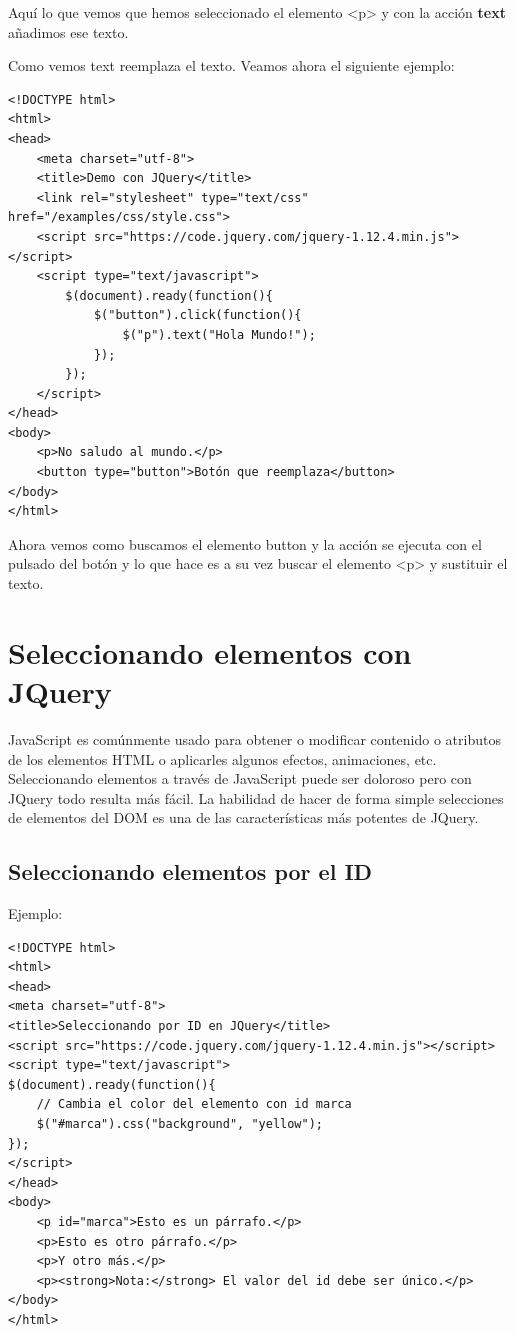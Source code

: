 \documentclass[11pt]{article}
\begin{document}
Aquí lo que vemos que hemos seleccionado el elemento <p> y con la acción \textbf{text} añadimos ese texto. 

Como vemos text reemplaza el texto. Veamos ahora el siguiente ejemplo:

\begin{verbatim}
<!DOCTYPE html>
<html>
<head>
    <meta charset="utf-8">
    <title>Demo con JQuery</title>
    <link rel="stylesheet" type="text/css" href="/examples/css/style.css">
    <script src="https://code.jquery.com/jquery-1.12.4.min.js"></script>
    <script type="text/javascript">
        $(document).ready(function(){
            $("button").click(function(){
                $("p").text("Hola Mundo!");
            });            
        });
    </script>
</head>
<body>
    <p>No saludo al mundo.</p>
    <button type="button">Botón que reemplaza</button>
</body>
</html>  
\end{verbatim}

Ahora vemos como buscamos el elemento button y la acción se ejecuta con el pulsado del botón y lo que hace es a su vez buscar el elemento <p> y sustituir el texto. 


\section*{Seleccionando elementos con JQuery}
\label{sec:org1c68db2}

JavaScript es comúnmente usado para obtener o modificar contenido o atributos de los elementos HTML o aplicarles algunos efectos, animaciones, etc. 
Seleccionando elementos a través de JavaScript puede ser doloroso pero con JQuery todo resulta más fácil. La habilidad de hacer de forma simple selecciones de elementos del DOM es una de las características más potentes de JQuery. 

\subsection*{Seleccionando elementos por el ID}
\label{sec:org649c28c}

Ejemplo:

\begin{verbatim}
<!DOCTYPE html>
<html>
<head>
<meta charset="utf-8">
<title>Seleccionando por ID en JQuery</title>
<script src="https://code.jquery.com/jquery-1.12.4.min.js"></script>
<script type="text/javascript">
$(document).ready(function(){
    // Cambia el color del elemento con id marca
    $("#marca").css("background", "yellow");
});
</script> 
</head>
<body>
    <p id="marca">Esto es un párrafo.</p>
    <p>Esto es otro párrafo.</p>
    <p>Y otro más.</p>
    <p><strong>Nota:</strong> El valor del id debe ser único.</p>
</body>
</html>                                		
\end{verbatim}
\end{document}
